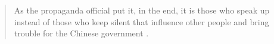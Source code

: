 \documentclass[12pt]{article}
\begin{document}
\begin{CJK*}{UTF8}{gbsn}
\begin{quote}
As the propaganda official put it, in the end, it is those who speak up instead of those who keep silent that influence other people and bring trouble for the Chinese government \cite[455]{lei2015contesting}.
\end{quote}


\end{CJK*}
\end{document}
